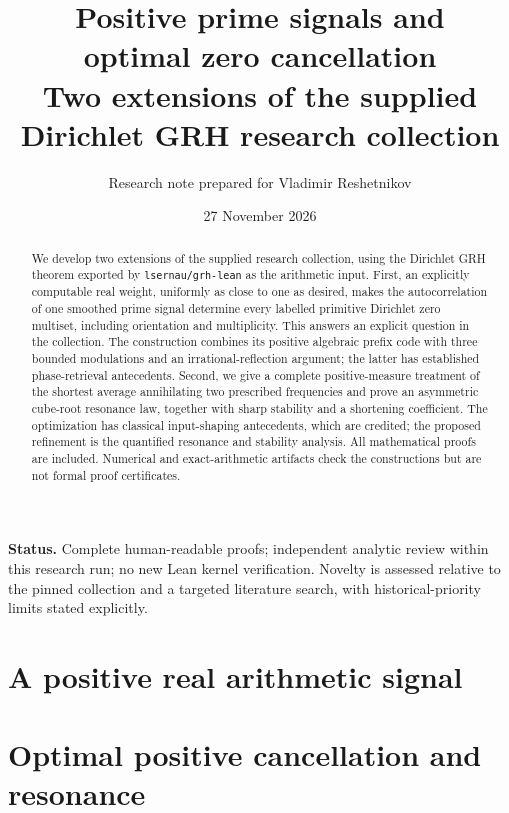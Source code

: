 \documentclass[11pt,a4paper]{article}
\title{\bfseries Positive prime signals and\protect\\optimal zero cancellation\\[5pt]
\large Two extensions of the supplied Dirichlet GRH research collection}
\author{Research note prepared for Vladimir Reshetnikov}
\date{27 November 2026}
\numberwithin{equation}{section}
\theoremstyle{definition}
\theoremstyle{remark}
\begin{document}
\maketitle
\begin{abstract}
We develop two extensions of the supplied research collection, using the
Dirichlet GRH theorem exported by \texttt{lsernau/grh-lean} as the arithmetic
input. First, an explicitly computable real weight, uniformly as close to
one as desired, makes the autocorrelation of one smoothed prime signal
determine every labelled primitive Dirichlet zero multiset, including
orientation and multiplicity. This answers an explicit question in the
collection. The construction combines its positive algebraic prefix code
with three bounded modulations and an irrational-reflection argument;
the latter has established phase-retrieval antecedents. Second, we give a
complete positive-measure treatment of the shortest average annihilating
two prescribed frequencies and prove an asymmetric cube-root resonance law,
together with sharp stability and a shortening coefficient. The
optimization has classical input-shaping antecedents, which are credited;
the proposed refinement is the quantified resonance and stability analysis.
All mathematical proofs are included. Numerical and exact-arithmetic
artifacts check the constructions but are not formal proof certificates.
\end{abstract}

\vspace{3pt}
\noindent\textbf{Status.} Complete human-readable proofs; independent
analytic review within this research run; no new Lean kernel verification.
Novelty is assessed relative to the pinned collection and a targeted
literature search, with historical-priority limits stated explicitly.

\tableofcontents
\newpage

\clearpage
\part{A positive real arithmetic signal}

\clearpage
\part{Optimal positive cancellation and resonance}

\clearpage
\appendix

\begingroup
\raggedright


\endgroup
\end{document}
